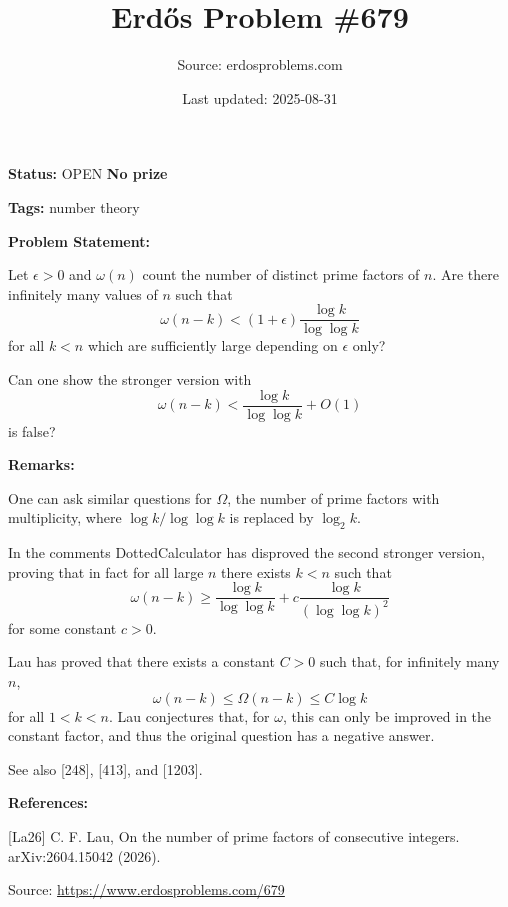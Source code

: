 \documentclass{article}
\title{Erd\H{o}s Problem \#679}
\date{Last updated: 2025-08-31}
\author{Source: erdosproblems.com}
\begin{document}
\maketitle

\noindent\textbf{Status:} OPEN \quad \textbf{No prize}

\noindent\textbf{Tags:} number theory

\medskip
\noindent\textbf{Problem Statement:}

Let $\epsilon>0$ and $\omega(n)$ count the number of distinct prime factors of $n$. Are there infinitely many values of $n$ such that\[\omega(n-k) < (1+\epsilon)\frac{\log k}{\log\log k}\]for all $k<n$ which are sufficiently large depending on $\epsilon$ only?

Can one show the stronger version with\[\omega(n-k) < \frac{\log k}{\log\log k}+O(1)\]is false?

\bigskip
\noindent\textbf{Remarks:}

One can ask similar questions for $\Omega$, the number of prime factors with multiplicity, where $\log k/\log\log k$ is replaced by $\log_2k$.

In the comments DottedCalculator has disproved the second stronger version, proving that in fact for all large $n$ there exists $k<n$ such that\[\omega(n-k)\geq \frac{\log k}{\log\log k} + c\frac{\log k}{(\log\log k)^2}\]for some constant $c>0$.

Lau \cite{La26} has proved that there exists a constant $C>0$ such that, for infinitely many $n$,\[\omega(n-k) \leq \Omega(n-k)\leq C\log k\]for all $1<k<n$. Lau conjectures that, for $\omega$, this can only be improved in the constant factor, and thus the original question has a negative answer.

See also [248], [413], and [1203].

\bigskip
\noindent\textbf{References:}

[La26] C. F. Lau, On the number of prime factors of consecutive integers. arXiv:2604.15042 (2026).

\bigskip
\noindent\small{Source: \url{https://www.erdosproblems.com/679}}
\end{document}
